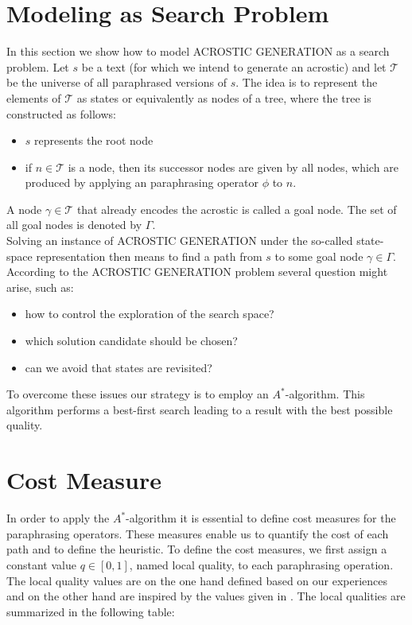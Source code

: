 \documentclass[11pt]{reportAlternative}
\begin{document}
\section{Modeling as Search Problem}
In this section we show how to model ACROSTIC GENERATION as a search problem. Let $s$ be a text (for which we intend to generate an acrostic) and let $\mathcal{T}$ be the universe of all paraphrased versions of $s$. The idea is to represent the elements of $\mathcal{T}$ as states or equivalently as nodes of a tree, where the tree is constructed as follows:
\begin{itemize}
\item $s$ represents the root node

\item if $n\in\mathcal{T}$ is a node, then its successor nodes are given by all nodes, which
are produced by applying an paraphrasing operator $\phi$ to $n$.

\end{itemize}

A node $\gamma\in\mathcal{T}$ that already encodes the acrostic is called a goal node. The set of all goal nodes is denoted by $\Gamma$.\\
Solving an instance of ACROSTIC GENERATION under the so-called state-space representation then means to find a path from $s$ to some goal node $\gamma\in\Gamma$. According to the 
ACROSTIC GENERATION problem several question might arise, such as:

\begin{itemize}

\item  how to control the exploration of the search space?

\item which solution candidate should be chosen?

\item can we avoid that states are revisited?

\end{itemize}

To overcome these issues our strategy is to employ an $A^*$-algorithm. This algorithm performs a best-first search leading to a result with the best possible quality.  



\section{Cost Measure}

In order to apply the $A^*$-algorithm it is essential to define cost measures for the paraphrasing operators. These measures enable us to quantify the cost of each path and to define the heuristic. To define the cost measures, we first assign a constant value $q\in [0,1]$, named local quality, to each paraphrasing operation. The local quality values are on the one hand defined based on our experiences and on the other hand are inspired by the values given in \cite{Stein}. The local qualities are summarized in the following table:
\end{document}

